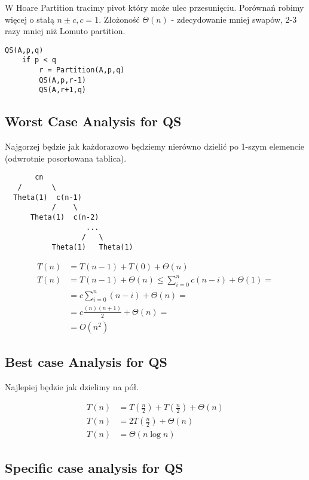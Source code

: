 \documentclass{article}
\begin{document}
W Hoare Partition tracimy pivot który może ulec przesunięciu. Porównań robimy więcej o stałą $n \pm c, c=1$. 
Złożoność $\Theta(n)$ - zdecydowanie mniej swapów, 2-3 razy mniej niż Lomuto partition.

\begin{verbatim}
QS(A,p,q)
    if p < q
        r = Partition(A,p,q)
        QS(A,p,r-1)
        QS(A,r+1,q)
\end{verbatim}

\subsection{Worst Case Analysis for QS}

Najgorzej będzie jak każdorazowo będziemy nierówno dzielić po 1-szym elemencie (odwrotnie posortowana tablica).

\begin{verbatim}
       cn
   /       \
  Theta(1)  c(n-1)
           /    \ 
      Theta(1)  c(n-2)
                   ...
                  /   \
           Theta(1)   Theta(1) 
\end{verbatim}

\begin{align}
    T(n) &= T(n-1) + T(0) + \Theta(n)\\
    T(n) &= T(n-1) + \Theta(n) \leq \sum_{i=0}^{n} c(n-i) + \Theta(1) = \\
    &= c\sum_{i=0}^{n} (n-i) + \Theta(n) =\\
    &= c \frac{(n)(n+1)}{2} + \Theta(n) =\\
    &= O(n^2)
\end{align}

\subsection{Best case Analysis for QS}

Najlepiej będzie jak dzielimy na pół.

\begin{align}
    T(n) &= T(\frac{n}{2}) + T(\frac{n}{2}) + \Theta(n) \\
    T(n) &= 2T(\frac{n}{2}) + \Theta(n) \\
    T(n) &= \Theta(n\log n)
\end{align}

\subsection{Specific case analysis for QS}
\end{document}
